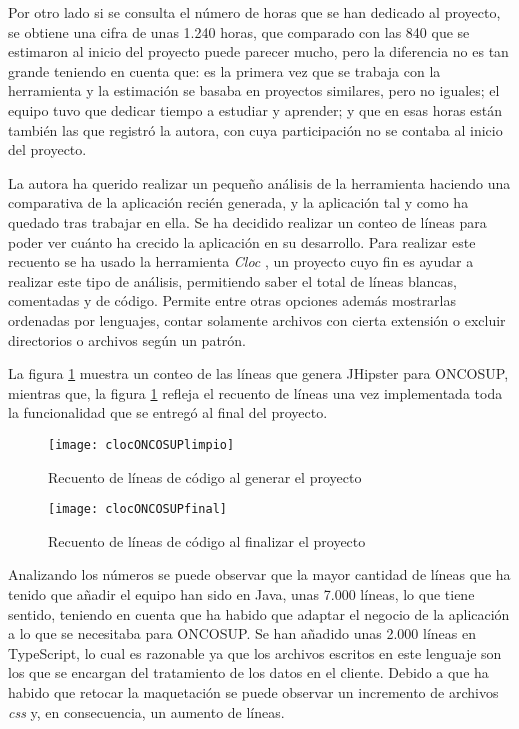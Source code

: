 Por otro lado si se consulta el número de horas que se han dedicado al proyecto, se obtiene una cifra de unas 1.240 horas, que comparado con las 840 que se estimaron al inicio del proyecto puede parecer mucho, pero la diferencia no es tan grande teniendo en cuenta que: es la primera vez que se trabaja con la herramienta y la estimación se basaba en proyectos similares, pero no iguales; el equipo tuvo que dedicar tiempo a estudiar y aprender; y que en esas horas están también las que registró la autora, con cuya participación no se contaba al inicio del proyecto.

La autora ha querido realizar un pequeño análisis de la herramienta haciendo una comparativa de la aplicación recién generada, y la aplicación tal y como ha quedado tras trabajar en ella. Se ha decidido realizar un conteo de líneas para poder ver cuánto ha crecido la aplicación en su desarrollo. Para realizar este recuento se ha usado la herramienta \emph{Cloc} \cite{cloc}, un proyecto cuyo fin es ayudar a realizar este tipo de análisis, permitiendo saber el total de líneas blancas, comentadas y de código. Permite entre otras opciones además mostrarlas ordenadas por lenguajes, contar solamente archivos con cierta extensión o excluir directorios o archivos según un patrón.

La figura \ref{fig:clocLimpio} muestra un conteo de las líneas que genera JHipster para ONCOSUP, mientras que, la figura \ref{fig:clocLimpio} refleja el recuento de líneas una vez implementada toda la funcionalidad que se entregó al final del proyecto. 

\begin{figure}[!h]
\begin{center}
\texttt{[image: clocONCOSUPlimpio]}
\caption{Recuento de líneas de código al generar el proyecto}
\label{fig:clocLimpio}
\end{center}
\end{figure}

\begin{figure}[!h]
\begin{center}
\texttt{[image: clocONCOSUPfinal]}
\caption{Recuento de líneas de código al finalizar el proyecto}
\label{fig:clocFinal}
\end{center}
\end{figure}

Analizando los números se puede observar que la mayor cantidad de líneas que ha tenido que añadir el equipo han sido en Java, unas 7.000 líneas, lo que tiene sentido, teniendo en cuenta que ha habido que adaptar el negocio de la aplicación a lo que se necesitaba para ONCOSUP. Se han añadido unas 2.000 líneas en TypeScript, lo cual es razonable ya que los archivos escritos en este lenguaje son los que se encargan del tratamiento de los datos en el cliente. Debido a que ha habido que retocar la maquetación se puede observar un incremento de archivos \emph{css} y, en consecuencia, un aumento de líneas.

